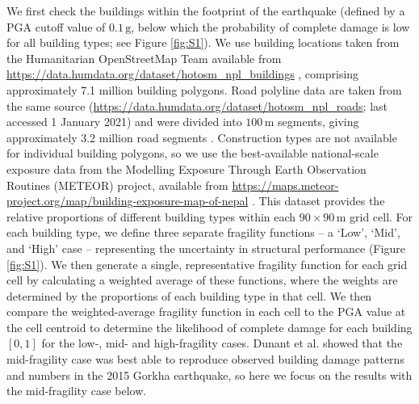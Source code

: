 \documentclass[preprint,12pt,authoryear]{elsarticle}
\providecommand{\DIFaddtex}[1]{{\protect\color{blue}\uwave{#1}}} %
\providecommand{\DIFaddbegin}{} %
\providecommand{\DIFaddend}{} %
\providecommand{\DIFadd}[1]{\texorpdfstring{\DIFaddtex{#1}}{#1}} %
\providecommand{\DIFaddincludegraphics}[2][]{{\color{blue}\fbox{\DIFOincludegraphics[#1]{#2}}}} %
\DeclareRobustCommand{\DIFaddbegin}{\DIFOaddbegin \let\includegraphics\DIFaddincludegraphics} %
\DeclareRobustCommand{\DIFaddend}{\DIFOaddend \let\includegraphics\DIFOincludegraphics} %
\begin{document}
We first check the buildings within the footprint of the earthquake (defined by a PGA cutoff value of $0.1\,\text{g}$, below which the probability of complete damage is low for all building types; see Figure \ref{fig:S1}). We use building locations taken from the Humanitarian OpenStreetMap Team available from \url{https://data.humdata.org/dataset/hotosm_npl_buildings} \DIFaddbegin \DIFadd{(last accessed \textcolor{red}{[DATE]})}\DIFaddend , comprising approximately 7.1 million building polygons. Road polyline data are taken from the same source (\url{https://data.humdata.org/dataset/hotosm_npl_roads}; last accessed 1 January 2021) and were divided into $100\,\text{m}$ segments, giving approximately 3.2 million road segments \citep{Dunant2025}. Construction types are not available for individual building polygons, so we use the best-available national-scale exposure data from the Modelling Exposure Through Earth Observation Routines (METEOR) project, available from \url{https://maps.meteor-project.org/map/building-exposure-map-of-nepal} \DIFaddbegin \DIFadd{(last accessed \textcolor{red}{[DATE]})}\DIFaddend . This dataset provides the relative proportions of different building types within each $90 \times 90\,\text{m}$ grid cell. For each building type, we define three separate fragility functions -- a `Low', `Mid', and `High' case -- representing the uncertainty in structural performance (Figure \ref{fig:S1}). We then generate a single, representative fragility function for each grid cell by calculating a weighted average of these functions, where the weights are determined by the proportions of each building type in that cell. We then compare the weighted-average fragility function in each cell to the PGA value at the cell centroid to determine the likelihood of complete damage for each building $[0,1]$ for the low-, mid- and high-fragility cases. Dunant et al. \citep{Dunant2025} showed that the mid-fragility case was best able to reproduce observed building damage patterns and numbers in the 2015 Gorkha earthquake, so here we focus on the results with the mid-fragility case below.
\end{document}
